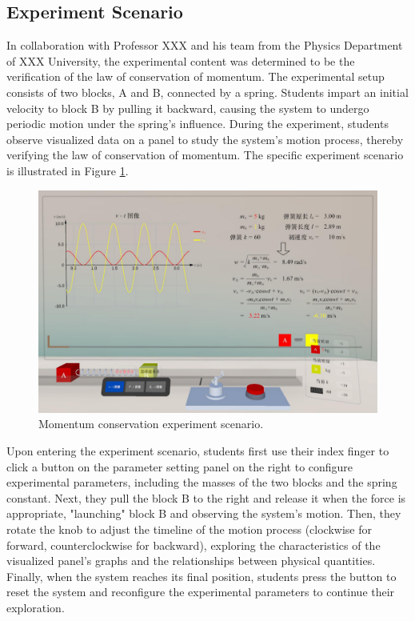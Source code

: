 \documentclass[runningheads]{llncs}
\begin{document}
\subsection{Experiment Scenario}
In collaboration with Professor XXX %
and his team from the Physics Department of XXX
University, the experimental content was determined to be the verification of the law of conservation of momentum. The experimental setup consists of two blocks, A and B, connected by a spring. Students impart an initial velocity to block B by pulling it backward, causing the system to undergo periodic motion under the spring's influence. During the experiment, students observe visualized data on a panel to study the system's motion process, thereby verifying the law of conservation of momentum. The specific experiment scenario is illustrated in Figure \ref{fig:experiment-scenario}.

\begin{figure}
  \centering
  \includegraphics[width=\linewidth]{image/experiment-scenario.pdf}
  \caption{Momentum conservation experiment scenario.}
  \label{fig:experiment-scenario}
\end{figure}

Upon entering the experiment scenario, students first use their index finger to click a button on the parameter setting panel on the right to configure experimental parameters, including the masses of the two blocks and the spring constant. Next, they pull the block B to the right and release it when the force is appropriate, "launching" block B and observing the system's motion. Then, they rotate the knob to adjust the timeline of the motion process (clockwise for forward, counterclockwise for backward), exploring the characteristics of the visualized panel's graphs and the relationships between physical quantities. Finally, when the system reaches its final position, students press the button to reset the system and reconfigure the experimental parameters to continue their exploration.
\end{document}
